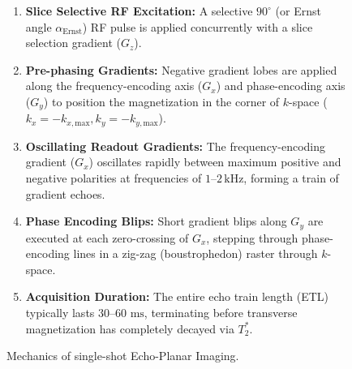 \documentclass[11pt,a4paper]{article}
\begin{document}
\begin{figure}[htbp]
\centering
\begin{tcolorbox}[colback=teal!5!white,colframe=teal!60!black,title=\textbf{Single-Shot 2D GE-EPI Pulse Sequence Architecture},width=\linewidth]
\small
\begin{enumerate}[leftmargin=1.5em]
    \item \textbf{Slice Selective RF Excitation:} A selective $90^\circ$ (or Ernst angle $\alpha_{\text{Ernst}}$) RF pulse is applied concurrently with a slice selection gradient ($G_z$).
    \item \textbf{Pre-phasing Gradients:} Negative gradient lobes are applied along the frequency-encoding axis ($G_x$) and phase-encoding axis ($G_y$) to position the magnetization in the corner of $k$-space ($k_x = -k_{x,\text{max}}, k_y = -k_{y,\text{max}}$).
    \item \textbf{Oscillating Readout Gradients:} The frequency-encoding gradient ($G_x$) oscillates rapidly between maximum positive and negative polarities at frequencies of $1\text{--}2\,\text{kHz}$, forming a train of gradient echoes.
    \item \textbf{Phase Encoding Blips:} Short gradient blips along $G_y$ are executed at each zero-crossing of $G_x$, stepping through phase-encoding lines in a zig-zag (boustrophedon) raster through $k$-space.
    \item \textbf{Acquisition Duration:} The entire echo train length (ETL) typically lasts $30\text{--}60\text{ ms}$, terminating before transverse magnetization has completely decayed via $T_2^*$.
\end{enumerate}
\end{tcolorbox}
\caption{Mechanics of single-shot Echo-Planar Imaging.}
\label{fig:epi_physics}
\end{figure}
\end{document}
